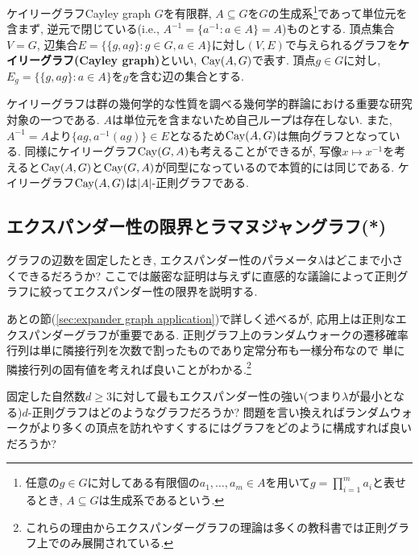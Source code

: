 %
\begin{definition}{ケイリーグラフ}{Cayley graph}
    $G$を有限群, $A\subseteq G$を$G$の生成系\footnote{任意の$g\in G$に対してある有限個の$a_1,\dots,a_m\in A$を用いて$g=\prod_{i=1}^ma_i$と表せるとき, $A\subseteq G$は生成系であるという.}であって単位元を含まず, 逆元で閉じている(i.e., $A^{-1}=\{a^{-1}\colon a\in A\}=A$)ものとする.
    頂点集合$V=G$, 辺集合$E=\{\{g,ag\}\colon g\in G,a\in A\}$に対し$(V,E)$で与えられるグラフを\textbf{ケイリーグラフ(Cayley graph)}といい, $\mathrm{Cay}(A,G)$で表す.
    頂点$g\in G$に対し, $E_g=\{\{g,ag\}\colon a\in A\}$を$g$を含む辺の集合とする.
\end{definition}
%
ケイリーグラフは群の幾何学的な性質を調べる幾何学的群論における重要な研究対象の一つである.
$A$は単位元を含まないため自己ループは存在しない.
また, $A^{-1}=A$より$\{ag,a^{-1}(ag)\}\in E$となるため$\mathrm{Cay}(A,G)$は無向グラフとなっている.
同様にケイリーグラフ$\mathrm{Cay}(G,A)$も考えることができるが, 写像$x\mapsto x^{-1}$を考えると$\mathrm{Cay}(A,G)$と$\mathrm{Cay}(G,A)$が同型になっているので本質的には同じである.
ケイリーグラフ$\mathrm{Cay}(A,G)$は$|A|$-正則グラフである.


\subsection{エクスパンダー性の限界とラマヌジャングラフ(*)}
グラフの辺数を固定したとき, エクスパンダー性のパラメータ$\lambda$はどこまで小さくできるだろうか?
ここでは厳密な証明は与えずに直感的な議論によって正則グラフに絞ってエクスパンダー性の限界を説明する.

あとの節(\cref{sec:expander graph application})で詳しく述べるが,
応用上は正則なエクスパンダーグラフが重要である.
正則グラフ上のランダムウォークの遷移確率行列は単に隣接行列を次数で割ったものであり定常分布も一様分布なので
単に隣接行列の固有値を考えれば良いことがわかる.\footnote{これらの理由からエクスパンダーグラフの理論は多くの教科書では正則グラフ上でのみ展開されている.}

固定した自然数$d\ge 3$に対して最もエクスパンダー性の強い(つまり$\lambda$が最小となる)$d$-正則グラフはどのようなグラフだろうか?
問題を言い換えればランダムウォークがより多くの頂点を訪れやすくするにはグラフをどのように構成すれば良いだろうか?

